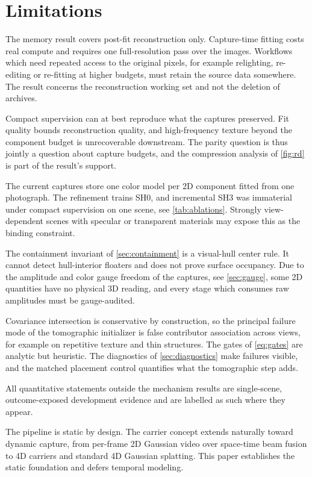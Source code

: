 \section{Limitations}
\label{sec:limitations}

The memory result covers post-fit reconstruction only.  Capture-time fitting costs real
compute and requires one full-resolution pass over the images.    Workflows which need repeated access to the original
pixels, for example relighting, re-editing or re-fitting at higher budgets, must retain
the source data somewhere.  The result concerns the reconstruction working set and not the
deletion of archives.

Compact supervision can at best reproduce what the captures preserved.  Fit quality
bounds reconstruction quality, and high-frequency texture beyond the component budget is
unrecoverable downstream.  The parity question is thus jointly a question about capture
budgets, and the compression analysis of \cref{fig:rd} is part of the result's support.

The current captures store one color model per 2D component fitted from one photograph.
The refinement trains SH0, and incremental SH3 was immaterial under compact supervision
on one scene, see \cref{tab:ablations}.  Strongly view-dependent scenes with specular or
transparent materials may expose this as the binding constraint.  

The containment invariant of \cref{sec:containment} is a visual-hull center rule.  It
cannot detect hull-interior floaters and does not prove surface occupancy.
  Due to the amplitude and color
gauge freedom of the captures, see \cref{sec:gauge}, some 2D quantities have no physical
3D reading, and every stage which consumes raw amplitudes must be gauge-audited.

Covariance intersection is conservative by construction, so the principal failure mode of
the tomographic initializer is false contributor association across views, for example on
repetitive texture and thin structures.  The gates of \cref{eq:gates} are analytic but
heuristic.  The diagnostics of \cref{sec:diagnostics} make failures visible, and the
matched placement control quantifies what the tomographic step adds.

All quantitative statements outside the mechanism results are single-scene,
outcome-exposed development evidence and are labelled as such where they appear.

The pipeline is static by design.  The carrier concept extends naturally toward dynamic
capture, from per-frame 2D Gaussian video over space-time beam fusion to 4D carriers and
standard 4D Gaussian splatting.  This paper establishes the static foundation and defers
temporal modeling.

